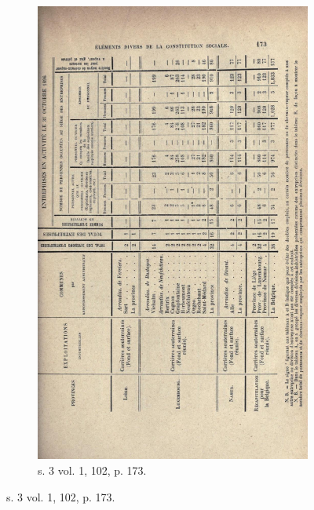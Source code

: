 \begin{figure}
\begin{subfigure}[t]{0.4\textwidth}
     \includegraphics[width=0.8\linewidth]{img/tabl_s3t1_m102_p173.png}
     \caption{s. 3 vol. 1, \no{} 102, p. 173.}
     \label{fig:ex_figures:table}
    \end{subfigure}
    \hspace{5pt}
    
    
    

\end{figure}
